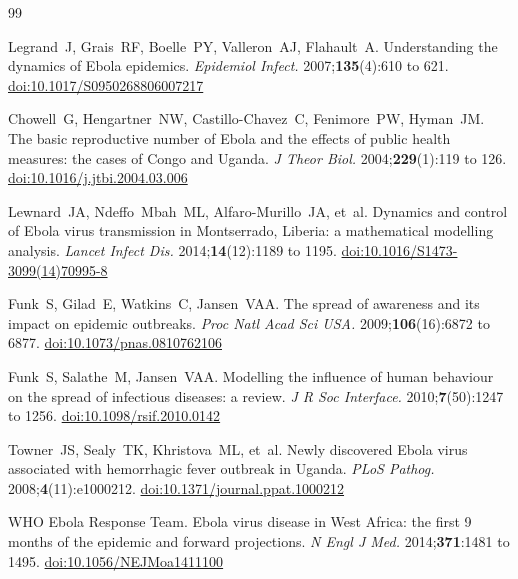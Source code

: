 \documentclass[12pt,a4paper]{article}
\begin{document}
\clearpage

\begin{thebibliography}{99}

Legrand~J, Grais~RF, Boelle~PY, Valleron~AJ, Flahault~A.
Understanding the dynamics of Ebola epidemics.
\textit{Epidemiol Infect.} 2007;\textbf{135}(4):610 to 621.
\href{https://doi.org/10.1017/S0950268806007217}{doi:10.1017/S0950268806007217}

Chowell~G, Hengartner~NW, Castillo-Chavez~C, Fenimore~PW, Hyman~JM.
The basic reproductive number of Ebola and the effects of public health
measures: the cases of Congo and Uganda.
\textit{J Theor Biol.} 2004;\textbf{229}(1):119 to 126.
\href{https://doi.org/10.1016/j.jtbi.2004.03.006}{doi:10.1016/j.jtbi.2004.03.006}

Lewnard~JA, Ndeffo~Mbah~ML, Alfaro-Murillo~JA, et~al.
Dynamics and control of Ebola virus transmission in Montserrado, Liberia:
a mathematical modelling analysis.
\textit{Lancet Infect Dis.} 2014;\textbf{14}(12):1189 to 1195.
\href{https://doi.org/10.1016/S1473-3099(14)70995-8}{doi:10.1016/S1473-3099(14)70995-8}

Funk~S, Gilad~E, Watkins~C, Jansen~VAA.
The spread of awareness and its impact on epidemic outbreaks.
\textit{Proc Natl Acad Sci USA.} 2009;\textbf{106}(16):6872 to 6877.
\href{https://doi.org/10.1073/pnas.0810762106}{doi:10.1073/pnas.0810762106}

Funk~S, Salathe~M, Jansen~VAA.
Modelling the influence of human behaviour on the spread of infectious
diseases: a review.
\textit{J R Soc Interface.} 2010;\textbf{7}(50):1247 to 1256.
\href{https://doi.org/10.1098/rsif.2010.0142}{doi:10.1098/rsif.2010.0142}

Towner~JS, Sealy~TK, Khristova~ML, et~al.
Newly discovered Ebola virus associated with hemorrhagic fever outbreak
in Uganda.
\textit{PLoS Pathog.} 2008;\textbf{4}(11):e1000212.
\href{https://doi.org/10.1371/journal.ppat.1000212}{doi:10.1371/journal.ppat.1000212}

WHO Ebola Response Team.
Ebola virus disease in West Africa: the first 9 months of the epidemic
and forward projections.
\textit{N Engl J Med.} 2014;\textbf{371}:1481 to 1495.
\href{https://doi.org/10.1056/NEJMoa1411100}{doi:10.1056/NEJMoa1411100}


\end{thebibliography}
\end{document}
